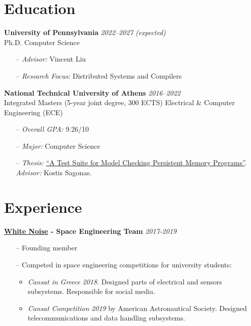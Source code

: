 \documentclass[margin]{res}
\newcommand{\field}[2]{\noindent \textbf{#1} \hfill #2 \\}
\begin{document}
\begin{resume}

\section{Education}

\field{University of Pennsylvania}  {\emph{2022--2027 (expected)}} 
Ph.D. Computer Science
\begin{itemize}[nosep]
  \item[--] \emph{Advisor:} Vincent Liu
  \item[--] \emph{Research Focus:} Distributed Systems and Compilers
\end{itemize}
 
\field{National Technical University of Athens}  {\emph{2016--2022}} 
Integrated Masters (5-year joint degree, 300 ECTS) Electrical \& Computer Engineering (ECE)
\begin{itemize}[nosep]
\item[--] \emph{Overall GPA:} 9.26/10 
\item[--] \emph{Major:} Computer Science 
\item[--] \emph{Thesis:} \href{http://artemis.cslab.ece.ntua.gr:8080/jspui/bitstream/123456789/18415/1/thesis.pdf}{``A Test Suite for Model Checking Persistent Memory Programs''}. \emph{Advisor:} Kostis Sagonas.
\end{itemize}

\section{Experience}

\textbf{\href{https://whitenoise.gr/}{White Noise} - Space Engineering Team} \hfill \emph{2017-2019}
\begin{itemize}[nosep]
\item[--] Founding member
\item[--] Competed in space engineering competitions for university students:
\begin{itemize}[nosep]
\item \textit{Cansat in Greece 2018}. 
  Designed parts of electrical and sensors subsystems. 
  Responsible for social media.
\item \textit{Cansat Competition 2019} by American Astronautical Society. 
  Designed telecommunications and data handling subsystems.
\end{itemize}
\end{itemize}


\end{resume}
\end{document}
